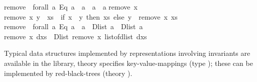 \begin{isabellebody}
\begin{isamarkuptext}
\isanewline
remove{}\ {}{}\ forall\ a{}\ {}Eq\ a{}\ {}{}\ a\ {}{}\ {}a{}\ {}{}\ {}a{}{}\isanewline
remove{}\ x\ {}{}\ {}\ {}{}{}\isanewline
remove{}\ x\ {}y\ {}\ xs{}\ {}\ {}if\ x\ {}{}\ y\ then\ xs\ else\ y\ {}\ remove{}\ x\ xs{}{}\isanewline
\isanewline
remove\ {}{}\ forall\ a{}\ {}Eq\ a{}\ {}{}\ a\ {}{}\ Dlist\ a\ {}{}\ Dlist\ a{}\isanewline
remove\ x\ dxs\ {}\ Dlist\ {}remove{}\ x\ {}list{}of{}dlist\ dxs{}{}{}\isanewline
\isanewline
{}\isanewline%
\end{isamarkuptext}%
\isamarkuptrue%
%
\endisatagquotetypewriter
{\isafoldquotetypewriter}%
%
\isadelimquotetypewriter
%
\endisadelimquotetypewriter
%
\begin{isamarkuptext}%
Typical data structures implemented by representations involving
  invariants are available in the library, theory 
  specifies key-value-mappings (type );
  these can be implemented by red-black-trees (theory ).%
\end{isamarkuptext}%
\isamarkuptrue%
%
\isadelimtheory
%
\endisadelimtheory
%
\isatagtheory
{}\isamarkupfalse%
%
\endisatagtheory
{\isafoldtheory}%
%
\isadelimtheory
%
\endisadelimtheory
\isanewline
\isanewline
\end{isabellebody}%
